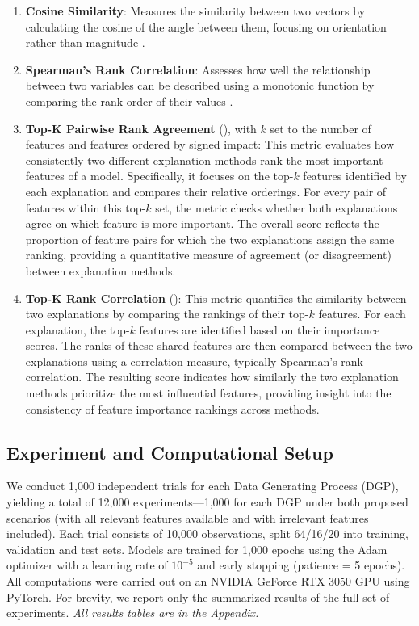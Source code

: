 \documentclass[preprint,12pt,authoryear]{sn-jnl}
\newcommand{\sectionlabel}{Appendix}
\begin{document}
\begin{enumerate} [leftmargin=*, itemsep=0pt, topsep=2pt, parsep=0pt]
    \item \textbf{Cosine Similarity}: Measures the similarity between two vectors by calculating the cosine of the angle between them, focusing on orientation rather than magnitude \citep{wilming2022scrutinizing}.
    \item \textbf{Spearman's Rank Correlation}: Assesses how well the relationship between two variables can be described using a monotonic function by comparing the rank order of their values \citep{wilming2022scrutinizing}.
    \item \textbf{Top-K Pairwise Rank Agreement} (\cite{krishna2022disagreement}), with $k$ set to the number of features and features ordered by signed impact: This metric evaluates how consistently two different explanation methods rank the most important features of a model. Specifically, it focuses on the top-$k$ features identified by each explanation and compares their relative orderings. For every pair of features within this top-$k$ set, the metric checks whether both explanations agree on which feature is more important. The overall score reflects the proportion of feature pairs for which the two explanations assign the same ranking, providing a quantitative measure of agreement (or disagreement) between explanation methods. 
    \item \textbf{Top-K Rank Correlation} (\cite{krishna2022disagreement}): This metric quantifies the similarity between two explanations by comparing the rankings of their top-$k$ features. For each explanation, the top-$k$ features are identified based on their importance scores. The ranks of these shared features are then compared between the two explanations using a correlation measure, typically Spearman’s rank correlation. The resulting score indicates how similarly the two explanation methods prioritize the most influential features, providing insight into the consistency of feature importance rankings across methods.
\end{enumerate}

\subsection{Experiment and Computational Setup}

We conduct 1,000 independent trials for each Data Generating Process (DGP), yielding a total of 12,000 experiments—1,000 for each DGP under both proposed scenarios (with all relevant features available and with irrelevant features included). Each trial consists of 10,000 observations, split 64/16/20 into training, validation and test sets. Models are trained for 1,000 epochs using the Adam optimizer \citep{kingma2014adam} with a learning rate of $10^{-5}$ and early stopping (patience = 5 epochs). All computations were carried out on an NVIDIA GeForce RTX 3050 GPU using PyTorch. For brevity, we report only the summarized results of the full set of experiments. \textit{All results tables are in the \sectionlabel.}
\end{document}
